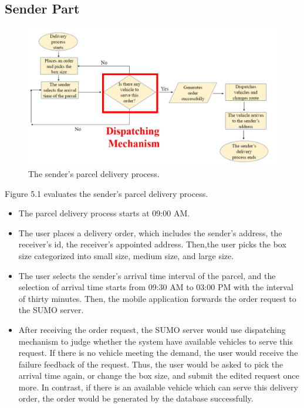 \documentclass[12pt]{ksthesis}
\begin{document}
\begin{thesis}
{\section{Sender Part}

\begin{figure}[H]
\centering
\includegraphics[width=1.14\textwidth]{./Thesis_figures/F5-1_sender_delivery_process.PNG}
\caption{\large The sender’s parcel delivery process.}
\vspace{0.5cm}
\label{Fig:sender_process}
\end{figure}

Figure 5.1 evaluates the sender’s parcel delivery process.


\begin{itemize}
\item
The parcel delivery process starts at 09:00 AM.

\item
The user places a delivery order, which includes the sender’s address, the receiver’s id, the receiver’s appointed address. Then,the user picks the box size categorized into small size, medium size, and large size.


\item
The user selects the sender’s arrival time interval of the parcel, and the selection of arrival time starts from 09:30 AM to 03:00 PM with the interval of thirty minutes. Then, the mobile application forwards the order request to the SUMO server.

\item
After receiving the order request, the SUMO server would use dispatching mechanism to judge whether the system have available vehicles to serve this request. If there is no vehicle meeting the demand, the user would receive the failure feedback of the request. Thus, the user would be asked to pick the arrival time again, or change the box size, and submit the edited request once more.
In contrast, if there is an available vehicle which can serve this delivery order, the order would be generated by the database successfully.


\end{itemize}}
\end{thesis}
\end{document}

